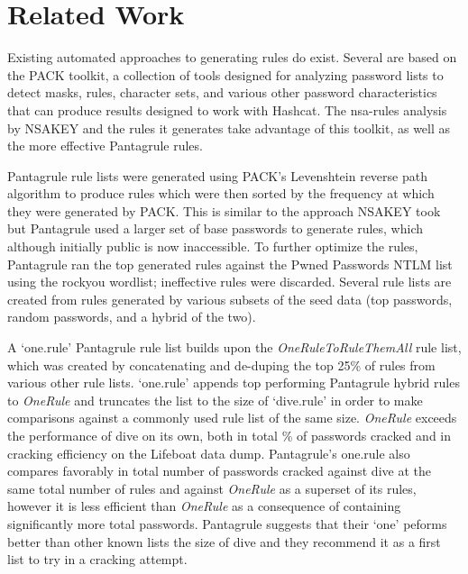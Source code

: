 \documentclass[letterpaper,twocolumn,10pt]{article}
\begin{document}



\section{Related Work}
\label{sec:related-work}

Existing automated approaches to generating rules do exist. Several are based
on the PACK toolkit,\cite{PACK} a collection of tools designed for analyzing
password lists to detect masks, rules, character sets, and various other
password characteristics that can produce results designed to work with
Hashcat. The nsa-rules analysis by NSAKEY\cite{NSAKEY} and the rules it
generates take advantage of this toolkit, as well as the more effective
Pantagrule rules.\cite{pantagrule}

Pantagrule rule lists were generated using PACK's Levenshtein reverse path
algorithm to produce rules which were then sorted by the frequency at which
they were generated by PACK. This is similar to the approach NSAKEY took but
Pantagrule used a larger set of base passwords to generate rules, which
although initially public is now inaccessible. To further optimize the rules,
Pantagrule ran the top generated rules against the Pwned Passwords NTLM list
using the rockyou wordlist; ineffective rules were discarded. Several rule lists
are created from rules generated by various subsets of the seed data (top
passwords, random passwords, and a hybrid of the two).

A `one.rule' Pantagrule rule list builds upon the \textit{OneRuleToRuleThemAll}
rule list, which was created by concatenating and de-duping the top 25\% of
rules from various other rule lists.\cite{ortrta} `one.rule' appends top
performing Pantagrule hybrid rules to \textit{OneRule} and truncates the list
to the size of `dive.rule' in order to make comparisons against a commonly used
rule list of the same size.
\textit{OneRule} exceeds the performance of dive on its own, both in total \%
of passwords cracked and in cracking efficiency on the Lifeboat data dump.
Pantagrule's one.rule also compares favorably in total number of passwords
cracked against dive at the same total number of rules and against
\textit{OneRule} as a superset of its rules, however it is less efficient than
\textit{OneRule} as a consequence of containing significantly more total
passwords. Pantagrule suggests that their `one' peforms better than other known
lists the size of dive and they recommend it as a first list to try in a
cracking attempt.
\end{document}
